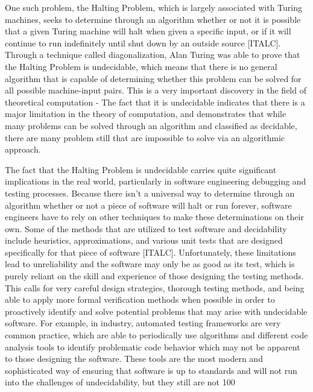 \documentclass{article}
\theoremstyle{theorem}
\theoremstyle{definition}
\theoremstyle{remark}
\begin{document}
One such problem, the Halting Problem, which is largely associated with Turing machines, seeks to determine through an algorithm whether or not it is possible that a given Turing machine will halt when given a specific input, or if it will continue to run indefinitely until shut down by an outside source [ITALC]. Through a technique called diagonalization, Alan Turing was able to prove that the Halting Problem is undecidable, which means that there is no general algorithm that is capable of determining whether this problem can be solved for all possible machine-input pairs. This is a very important discovery in the field of theoretical computation - The fact that it is undecidable indicates that there is a major limitation in the theory of computation, and demonstrates that while many problems can be solved through an algorithm and classified as decidable, there are many problem still that are impossible to solve via an algorithmic approach. 

The fact that the Halting Problem is undecidable carries quite significant implications in the real world, particularly in software engineering debugging and testing processes. Because there isn’t a universal way to determine through an algorithm whether or not a piece of software will halt or run forever, software engineers have to rely on other techniques to make these determinations on their own. Some of the methods that are utilized to test software and decidability include heuristics, approximations, and various unit tests that are designed specifically for that piece of software [ITALC]. Unfortunately, these limitations lead to unreliability and the software may only be as good as its test, which is purely reliant on the skill and experience of those designing the testing methods. This calls for very careful design strategies, thorough testing methods, and being able to apply more formal verification methods when possible in order to proactively identify and solve potential problems that may arise with undecidable software. For example, in industry, automated testing frameworks are very common practice, which are able to periodically use algorithms and different code analysis tools to identify problematic code behavior which may not be apparent to those designing the software. These tools are the most modern and sophisticated way of ensuring that software is up to standards and will not run into the challenges of undecidability, but they still are not 100%
\end{document}
